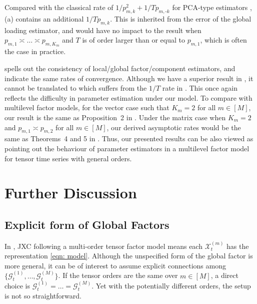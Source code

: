 \documentclass[aos]{imsart}
\theoremstyle{plain}
\theoremstyle{definition}
\def\cG{\mathcal{G}} \def\cH{\boldsymbol{\mathcal{H}}} \def\cI{\mathcal{I}}
\def\cX{\mathcal{X}}
\begin{document}
Compared with the classical rate of $1/p_{m,k}^2 + 1/Tp_{m,\text{-}k}$ for PCA-type estimators \citep[e.g.][]{barigozzi2022statistical}, (a) contains an additional $1/Tp_{m,k}$. This is inherited from the error of the global loading estimator, and would have no impact to the result when $p_{m,1}\asymp \dots \asymp p_{m,K_m}$ and $T$ is of order larger than or equal to $p_{m,1}$, which is often the case in practice.


 spells out the consistency of local/global factor/component estimators, and indicate the same rates of convergence. Although we have a superior result in , it cannot be translated to  which suffers from the $1/T$ rate in . This once again reflects the difficulty in parameter estimation under our model. To compare with multilevel factor models, for the vector case such that $K_m=2$ for all $m\in[M]$, our result is the same as Proposition~2 in \cite{Choietal2018}. Under the matrix case when $K_m=2$ and $p_{m,1}\asymp p_{m,2}$ for all $m\in[M]$, our derived asymptotic rates would be the same as Theorems~4 and 5 in \cite{Zhangetal2025}. Thus, our presented results can be also viewed as pointing out the behaviour of parameter estimators in a multilevel factor model for tensor time series with general orders.




\section{Further Discussion}
\label{sec: further_discussion}



\subsection{Explicit form of Global Factors}
\label{subsec: explicit_global_fac}


In , JXC following a multi-order tensor factor model means each $\cX_t^{(m)}$ has the representation \eqref{eqn: model}. Although the unspecified form of the global factor is more general, it can be of interest to assume explicit connections among $\big\{ \cG_t^{(1)}, \dots, \cG_t^{(M)} \big\}$. If the tensor orders are the same over $m\in[M]$, a direct choice is $\cG_t^{(1)} =\dots =\cG_t^{(M)}$. Yet with the potentially different orders, the setup is not so straightforward.
\end{document}
